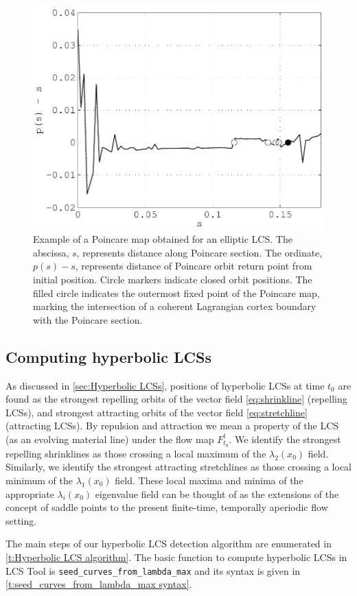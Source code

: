 \documentclass[5p]{elsarticle}
\begin{document}
\begin{figure}
\begin{center}
\includegraphics[width=.475\textwidth]{graphics/double_gyre/poincare_return_map}
\end{center}
\caption{Example of a Poincare map obtained for an elliptic LCS. The abscissa, $s$, represents distance along Poincare section. The ordinate, $p(s) - s$, represents distance of Poincare orbit return point from initial position. Circle markers indicate closed orbit positions. The filled circle indicates the outermost fixed point of the Poincare map, marking the intersection of a coherent Lagrangian cortex boundary with the Poincare section.}
\label{f:Poincare return map}
\end{figure}

\subsection{Computing hyperbolic LCSs}

\begin{sloppypar}
As discussed in \cref{sec:Hyperbolic LCSs}, positions of hyperbolic LCSs at time $t_0$ are found as the strongest repelling orbits of the vector field \cref{eq:shrinkline} (repelling LCSs), and strongest attracting orbits of the vector field \cref{eq:stretchline} (attracting LCSs). By repulsion and attraction we mean a property of the LCS (as an evolving material line) under the flow map $F_{t_0}^t$. We identify the strongest repelling shrinklines as those crossing a local maximum of the $\lambda_2(x_0)$ field. Similarly, we identify the strongest attracting stretchlines as those crossing a local minimum of the $\lambda_1(x_0)$ field. These local maxima and minima of the appropriate $\lambda_i(x_0)$ eigenvalue field can be thought of as the extensions of the concept of saddle points to the present finite-time, temporally aperiodic flow setting.
\end{sloppypar}

\begin{sloppypar}
The main steps of our hyperbolic LCS detection algorithm are enumerated in \cref{t:Hyperbolic LCS algorithm}. The basic function to compute hyperbolic LCSs in LCS Tool is \lstinline!seed_curves_from_lambda_max! and its syntax is given in \cref{t:seed_curves_from_lambda_max syntax}.
\end{sloppypar}
\end{document}
